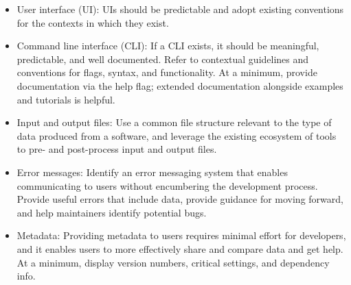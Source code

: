 \documentclass[]{nlr}
\begin{document}
\begin{itemize}
\item User interface (UI): UIs should be predictable and adopt existing conventions for the contexts in which they exist.

\item Command line interface (CLI): If a CLI exists, it should be meaningful, predictable, and well documented.
Refer to contextual guidelines and conventions for flags, syntax, and functionality.
At a minimum, provide documentation via the help flag; extended documentation alongside
examples and tutorials is helpful.

\item Input and output files: Use a common file structure relevant to the type of data produced from a software,
and leverage the existing ecosystem of tools to pre- and post-process input and output files.

\item Error messages: Identify an error messaging system that enables communicating to users without encumbering
the development process.
Provide useful errors that include data, provide guidance for moving forward, and help maintainers
identify potential bugs.

\item Metadata: Providing metadata to users requires minimal effort for developers, and it enables users to more
effectively share and compare data and get help. At a minimum, display version numbers, critical
settings, and dependency info.
\end{itemize}
\end{document}
